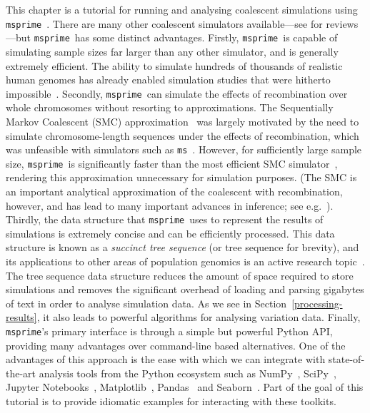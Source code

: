 \documentclass[graybox]{svmult}
\newcommand{\msprime}[0]{\texttt{msprime}}
\newcommand{\ms}[0]{\texttt{ms}}
\begin{document}
This chapter is a tutorial for running and analysing coalescent simulations
using \msprime~\citep{kelleher2016efficient}.
There are many other coalescent simulators available---see
\citep{carvajal2008simulation,liu2008survey,arenas2012simulation,
yuan2012overview,hoban2012computer} for reviews---but \msprime\ has
some distinct advantages. Firstly, \msprime\ is capable of simulating
sample sizes far larger than any other simulator, and is generally
extremely efficient. The ability to simulate
hundreds of thousands of realistic human genomes has already enabled simulation studies that were hitherto impossible~\citep{martin2017human}.
Secondly, \msprime\ can simulate the effects of recombination over
whole chromosomes without resorting to approximations. The
Sequentially Markov Coalescent (SMC)
approximation~\citep{mcvean2005approximating} was largely motivated by the
need to simulate chromosome-length sequences under the effects of
recombination,
which was unfeasible with simulators such as \ms~\citep{hudson2002generating}.
However, for sufficiently large sample size, \msprime\ is significantly
faster than the most efficient SMC simulator~\citep{staab2014scrm},
rendering this approximation unnecessary for simulation purposes. 
(The SMC is an important analytical approximation of the coalescent with recombination, however, and has lead to many important advances in inference; see e.g.~\citep{
li2011inference,
harris2013inferring,
schiffels2014inferring,
rasmussen2014genome}). Thirdly, the data structure that \msprime\ uses
to represent the results of simulations is extremely concise and
can be efficiently processed. This data structure is known as a
\emph{succinct tree sequence} (or tree sequence for brevity),
and its applications to other areas
of population genomics is an active research
topic~\citep{kelleher2018efficient}. The tree sequence data
structure reduces the amount of space
required to store simulations and removes the significant
overhead of loading and parsing gigabytes of text in order to analyse
simulation data. As we see in Section~\ref{processing-results}, it also
leads to powerful algorithms for analysing variation data. Finally,
\msprime's primary interface is through a simple but powerful Python
API, providing many advantages over command-line based alternatives.
One of the advantages of this approach is the ease with which we
can integrate with state-of-the-art analysis tools from the Python
ecosystem such as NumPy~\citep{walt2011numpy}, SciPy~\citep{jones-2018-scipy},
Jupyter Notebooks~\citep{perez2007ipython},
Matplotlib~\citep{hunter2007matplotlib}, Pandas~\citep{mckinney2010data}
and Seaborn~\citep{michael_waskom_2017_883859}. Part of the goal
of this tutorial is to provide idiomatic examples for interacting
with these toolkits.
\end{document}
